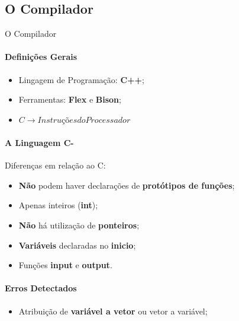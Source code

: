 \documentclass[aspectratio=169]{beamer}
\begin{document}
	\subsection{O Compilador}
	\begin{frame}{O Compilador}
		\only<1>
		{
			\framesubtitle{Definições Gerais}
			
			\begin{itemize}
				\item Lingagem de Programação: \textbf{C++};
				
				\vspace{0.5cm}
				
				\item Ferramentas: \textbf{Flex} e \textbf{Bison};
				
				\vspace{0.5cm}
				
				
				\item $C \to Instruções do Processador$
			\end{itemize}
			
		}
		{
			\framesubtitle{A Linguagem C-}
			
			Diferenças em relação ao C:
			
			\begin{itemize}
				\item \textbf{Não} podem haver declarações de \textbf{protótipos de funções};
				
				\vspace{0.5cm}
				
				\item Apenas inteiros (\textbf{int});
				
				\vspace{0.5cm}
				
				\item \textbf{Não} há utilização de \textbf{ponteiros};
				
				\vspace{0.5cm}
				
				\item \textbf{Variáveis} declaradas no \textbf{inicio};
				
				
				\vspace{0.5cm}
				
				\item Funções \textbf{input} e \textbf{output}.
			\end{itemize} 
		}
		{
			\framesubtitle{Erros Detectados}
			\begin{itemize}
				\item Atribuição de \textbf{variável a vetor} ou vetor a variável;
				

\end{itemize}}
\end{frame}
\end{document}

